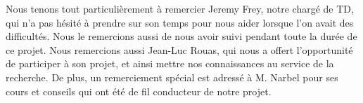 \begin{thanks_perso}
Nous tenons tout particulièrement à remercier Jeremy Frey, notre chargé de TD, qui n'a pas hésité à prendre sur son temps pour nous aider lorsque l'on avait des difficultés. Nous le remercions aussi de nous avoir suivi pendant toute la durée de ce projet.
Nous remercions aussi Jean-Luc Rouas, qui nous a offert l'opportunité de participer à son projet, et ainsi mettre nos connaissances au service de la recherche.
De plus, un remerciement spécial est adressé à M. Narbel pour ses cours et conseils qui ont été de fil conducteur de notre projet.
\end{thanks_perso}